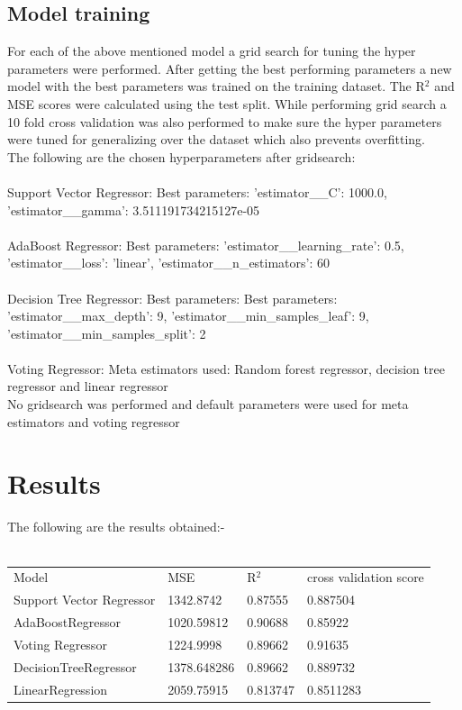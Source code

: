 \documentclass{article}
\begin{document}
\subsection{Model training}
For each of the above mentioned model a grid search for tuning the hyper parameters were performed. After getting the best performing parameters a new model with the best parameters was trained on the training dataset. The R$^2$ and MSE scores were calculated using the test split. While performing grid search a 10 fold cross validation was also performed to make sure the hyper parameters were tuned for generalizing over the dataset which also prevents overfitting.\\
The following are the chosen hyperparameters after gridsearch: \\\\
Support Vector Regressor: Best parameters: 'estimator\_\_C': 1000.0, 'estimator\_\_gamma': 3.511191734215127e-05\\ \\
AdaBoost Regressor: Best parameters: 'estimator\_\_learning\_rate': 0.5, 'estimator\_\_loss': 'linear', 'estimator\_\_n\_estimators': 60\\\\
Decision Tree Regressor: Best parameters: Best parameters:  'estimator\_\_max\_depth': 9, 'estimator\_\_min\_samples\_leaf': 9, 'estimator\_\_min\_samples\_split': 2\\\\
Voting Regressor: Meta estimators used: Random forest regressor, decision tree regressor and linear regressor\\No gridsearch was performed and default parameters were used for meta estimators and voting regressor


\section{Results}

The following are the results obtained:- \\\\
\begin{tabular}{llll}
Model                    & MSE         & R$^2$       & cross validation score \\
Support Vector Regressor & 1342.8742   & 0.87555  & 0.887504               \\
AdaBoostRegressor        & 1020.59812  & 0.90688  & 0.85922                \\
Voting Regressor         & 1224.9998   & 0.89662  & 0.91635                \\
DecisionTreeRegressor    & 1378.648286 & 0.89662  & 0.889732               \\
LinearRegression         & 2059.75915  & 0.813747 & 0.8511283             \\
\end{tabular}%
\\\\
\end{document}
